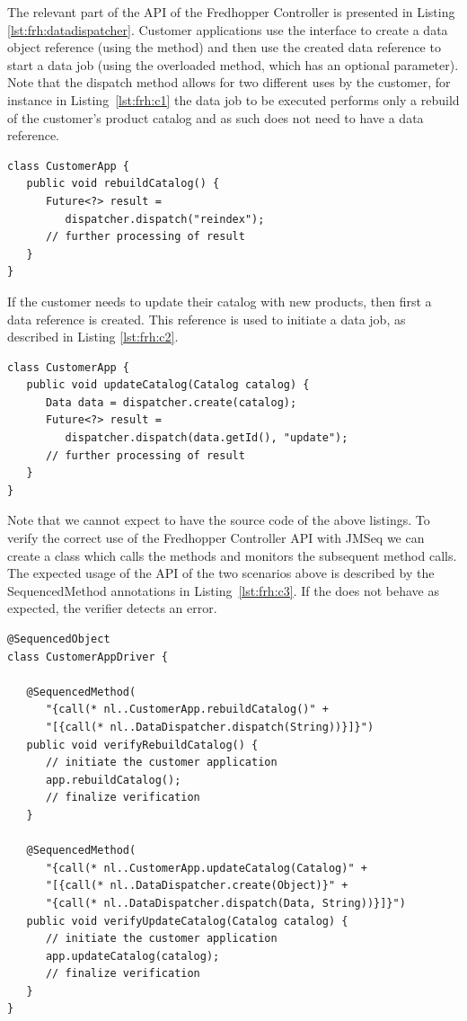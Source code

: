 The relevant part of the API of the Fredhopper Controller is presented in Listing \ref{lst:frh:datadispatcher}.
Customer applications use the interface to create a data object reference (using the  method) and then use the created data reference to start a data job (using the overloaded  method, which has an optional  parameter).
Note that the dispatch method allows for two different uses by the customer, for instance in Listing~\ref{lst:frh:c1} the data job to be executed performs only a rebuild of the customer's product catalog and as such does not need to have a data reference.
\lstset{language=java}
\begin{lstlisting}[label=lst:frh:c1, caption=A use case with no data requirement]
class CustomerApp {
   public void rebuildCatalog() {
      Future<?> result = 
         dispatcher.dispatch("reindex");
      // further processing of result
   }
}
\end{lstlisting}
If the customer needs to update their catalog with new products, then first a data reference is created. This reference is used to initiate a data job, as described in Listing \ref{lst:frh:c2}.
\lstset{language=java}
\begin{lstlisting}[label=lst:frh:c2, caption=A use case with data requirement]
class CustomerApp {
   public void updateCatalog(Catalog catalog) {
      Data data = dispatcher.create(catalog);
      Future<?> result = 
         dispatcher.dispatch(data.getId(), "update");
      // further processing of result
   }
}
\end{lstlisting}

Note that we cannot expect to have the source code of the above listings.  To verify the correct use of the Fredhopper Controller API
with JMSeq we can create a  class which calls the  methods and monitors the subsequent
method calls.  The expected usage of the API of the two scenarios above is described by the SequencedMethod annotations in Listing~\ref{lst:frh:c3}.
If the  does not behave as expected, the verifier detects an error.

\lstset{language=java}
\begin{lstlisting}[float=t,label=lst:frh:c3, caption=How to verify Fredhopper API usage]
@SequencedObject
class CustomerAppDriver {

   @SequencedMethod(
      "{call(* nl..CustomerApp.rebuildCatalog()" +
      "[{call(* nl..DataDispatcher.dispatch(String))}]}")
   public void verifyRebuildCatalog() {
      // initiate the customer application
      app.rebuildCatalog();
      // finalize verification
   }

   @SequencedMethod(
      "{call(* nl..CustomerApp.updateCatalog(Catalog)" +
      "[{call(* nl..DataDispatcher.create(Object)}" + 
      "{call(* nl..DataDispatcher.dispatch(Data, String))}]}")
   public void verifyUpdateCatalog(Catalog catalog) {
      // initiate the customer application
      app.updateCatalog(catalog);
      // finalize verification 
   }
}
\end{lstlisting}

